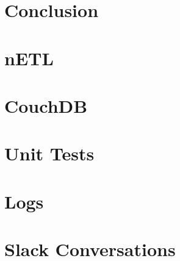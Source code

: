 \documentclass[
    a4paper
]{report}
\begin{document}
\chapter{Conclusion}



\newpage




\begin{appendices}
    \chapter{nETL}
    
    
    \chapter{CouchDB}
    
    \chapter{Unit Tests}
    \label{unit-tests}
    
    \chapter{Logs}
    
    \chapter{Slack Conversations}
    
    \newpage
    \listoffigures
    \newpage
    \listoftables
    \newpage
\end{appendices}

\end{document}
